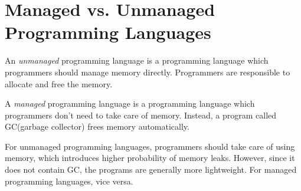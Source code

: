 \section{Managed vs. Unmanaged Programming Languages}

An \emph{unmanaged} programming language is a programming language which
programmers should manage memory directly. Programmers are responsible to
allocate and free the memory.

A \emph{managed} programming language is a programming language which
programmers don't need to take care of memory. Instead, a program called
GC(garbage collector) frees memory automatically.

For unmanaged programming languages, programmers should take care of using
memory, which introduces higher probability of memory leaks. However,
since it does not contain GC, the programs are generally more lightweight.
For managed programming languages, vice versa.
